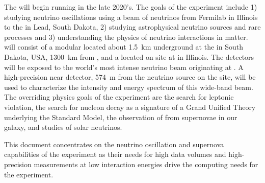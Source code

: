 \documentclass[../main-v1.tex]{subfiles}
\begin{document}
The   will begin running in the late 2020's. The goals of the experiment include 1) studying neutrino oscillations using a beam of neutrinos from Fermilab in Illinois to the   in Lead, South Dakota, 2) studying  astrophysical neutrino sources and rare processes and 3) understanding  the physics of neutrino interactions in matter.
 will consist of a modular  located about \SI{1.5}{km} underground at the  in South Dakota, USA, \SI{1300}{\km} from , and a  located on site at  in Illinois. The  detectors will be exposed to the world's most intense neutrino beam originating at . A high-precision near detector, \SI{574}{m} from the neutrino source on the  site, will be used to characterize the intensity and energy spectrum of this wide-band beam. The overriding physics goals of the  experiment are the search for leptonic  violation, the search for nucleon decay as a signature of a Grand Unified Theory underlying the Standard Model,  the observation of   from supernovae in our galaxy, and studies of solar neutrinos.  %


This document  concentrates on the neutrino oscillation and supernova capabilities of the experiment as their needs for high data volumes and high-precision measurements at low interaction energies drive the computing needs for the experiment. 

\end{document}
